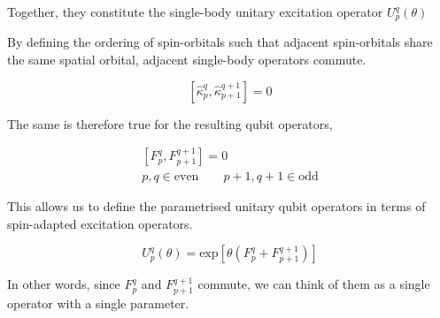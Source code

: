 
Together, they constitute the single-body unitary excitation operator $U^q_p (\theta)$


By defining the ordering of spin-orbitals such that adjacent spin-orbitals share the same spatial orbital, adjacent single-body operators commute.

\begin{equation*}
    \left[ \hat\kappa_p^q, \hat\kappa_{p+1}^{q+1} \right] = 0
\end{equation*}\smallskip

The same is therefore true for the resulting qubit operators,

\begin{equation*}
\begin{gathered}
    \left[ F_p^q, F_{p+1}^{q+1} \right] = 0 \\
    p, q \in \text{even} \qquad p+1, q+1 \in \text{odd}
\end{gathered}
\end{equation*}

This allows us to define the parametrised unitary qubit operators in terms of spin-adapted excitation operators.

\begin{equation*}
    U^q_p (\theta) = \text{exp}
    \left[ \theta \left( F_p^q + F_{p+1}^{q+1} \right) \right]
\end{equation*}

In other words, since $F_p^q$ and $F_{p+1}^{q+1}$ commute, we can think of them as a single operator with a single parameter.

